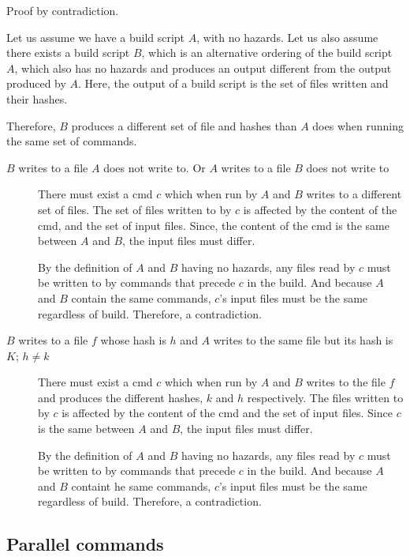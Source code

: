 Proof by contradiction.

Let us assume we have a build script $A$, with no hazards.  Let us also assume there exists a build script $B$, which is an alternative ordering of the build script $A$, which also has no hazards and produces an output different from the output produced by $A$.  Here, the output of a build script is the set of files written and their hashes.

Therefore, $B$ produces a different set of file and hashes than $A$ does when running the same set of commands.

\begin{description}
\item [$B$ writes to a file $A$ does not write to. Or $A$ writes to a file $B$ does not write to]
  There must exist a cmd $c$ which when run by $A$ and $B$ writes to a different set of files.  The set of files written to by $c$ is affected by the content of the cmd, and the set of input files.  Since, the content of the cmd is the same between $A$ and $B$, the input files must differ.

  By the definition of $A$ and $B$ having no hazards, any files read by $c$ must be written to by commands that precede $c$ in the build. And because $A$ and $B$ contain the same commands, $c$'s input files must be the same regardless of build.  Therefore, a contradiction.

\item [$B$ writes to a file $f$ whose hash is $h$ and $A$ writes to the same file but its hash is $K$; $h \neq k$]
  There must exist a cmd $c$ which when run by $A$ and $B$ writes to the file $f$ and produces the different hashes, $k$ and $h$ respectively.  The files written to by $c$ is affected by the content of the cmd and the set of input files. Since $c$ is the same between $A$ and $B$, the input files must differ.

  By the definition of $A$ and $B$ having no hazards, any files read by $c$ must be written to by commands that precede $c$ in the build.  And because $A$ and $B$ containt he same commands, $c$'s input files must be the same regardless of build.  Therefore, a contradiction.
  
\end{description}

\subsection{Parallel commands}
\label{sec:proof:parallel}

